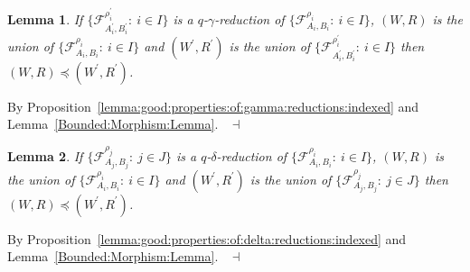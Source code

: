 \documentclass[draft]{article}
\newtheorem{lemma}{Lemma}
\newenvironment{proof}{{\bf Proof:}}{~$\dashv$\\}
\begin{document}
\begin{lemma}\label{lemma:gamma:reduction:modal:logic}
%
%
If $\{{\mathcal F}_{A_{i}^{\prime},B_{i}^{\prime}}^{\rho_{i}^{\prime}}:\ i{\in}I\}$ is a $q$-$\gamma$-reduction of $\{{\mathcal F}_{A_{i},B_{i}}^{\rho_{i}}:\ i{\in}I\}$, $(W,R)$ is the union of $\{{\mathcal F}_{A_{i},B_{i}}^{\rho_{i}}:\ i{\in}I\}$ and $(W^{\prime},R^{\prime})$ is the union of $\{{\mathcal F}_{A_{i}^{\prime},B_{i}^{\prime}}^{\rho_{i}^{\prime}}:\ i{\in}I\}$ then
$(W,R){\preceq}(W^{\prime},R^{\prime})$.
%
%
\end{lemma}
%
%
\begin{proof}
%
%
By Proposition~\ref{lemma:good:properties:of:gamma:reductions:indexed} and Lemma~\ref{Bounded:Morphism:Lemma}.
%
%
\medskip
%
%
\end{proof}
%
%
\begin{lemma}\label{lemma:delta:reduction:modal:logic}
%
%
If $\{{\mathcal F}_{A_{j},B_{j}}^{\rho_{j}}:\ j{\in}J\}$ is a $q$-$\delta$-reduction of $\{{\mathcal F}_{A_{i},B_{i}}^{\rho_{i}}:\ i{\in}I\}$, $(W,R)$ is the union of $\{{\mathcal F}_{A_{i},B_{i}}^{\rho_{i}}:\ i{\in}I\}$ and $(W^{\prime},R^{\prime})$ is the union of $\{{\mathcal F}_{A_{j},B_{j}}^{\rho_{j}}:\ j{\in}J\}$ then $(W,R){\preceq}(W^{\prime},R^{\prime})$.
%
%
\end{lemma}
%
%
\begin{proof}
%
%
By Proposition~\ref{lemma:good:properties:of:delta:reductions:indexed} and Lemma~\ref{Bounded:Morphism:Lemma}.
%
%
\medskip
%
%
\end{proof}
%
%
%
%
\end{document}
